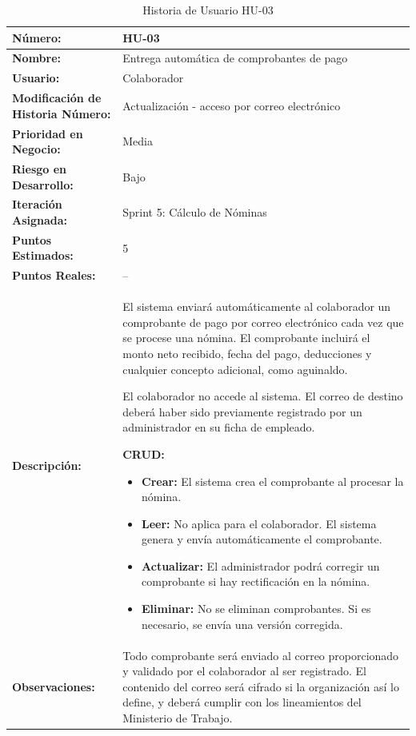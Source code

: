 \begin{table}[h]
	\centering
	\caption{Historia de Usuario HU-03}
	\begin{tabular}{|p{5cm}|p{9cm}|}
		\hline
		\textbf{Número:}                          & HU-03                                         \\ \hline
		\textbf{Nombre:}                          & Entrega automática de comprobantes de pago    \\ \hline
		\textbf{Usuario:}                         & Colaborador                                   \\ \hline
		\textbf{Modificación de Historia Número:} & Actualización - acceso por correo electrónico \\ \hline
		\textbf{Prioridad en Negocio:}            & Media                                         \\ \hline
		\textbf{Riesgo en Desarrollo:}            & Bajo                                          \\ \hline
		\textbf{Iteración Asignada:}              & Sprint 5: Cálculo de Nóminas                  \\ \hline
		\textbf{Puntos Estimados:}                & 5                                             \\ \hline
		\textbf{Puntos Reales:}                   & --                                            \\ \hline
		\textbf{Descripción:}                     &
		El sistema enviará automáticamente al colaborador un comprobante de pago por correo electrónico cada vez que se procese una nómina. El comprobante incluirá el monto neto recibido, fecha del pago, deducciones y cualquier concepto adicional, como aguinaldo.

		El colaborador no accede al sistema. El correo de destino deberá haber sido previamente registrado por un administrador en su ficha de empleado.

		\textbf{CRUD:}
		\begin{itemize}
			\item \textbf{Crear:} El sistema crea el comprobante al procesar la nómina.
			\item \textbf{Leer:} No aplica para el colaborador. El sistema genera y envía automáticamente el comprobante.
			\item \textbf{Actualizar:} El administrador podrá corregir un comprobante si hay rectificación en la nómina.
			\item \textbf{Eliminar:} No se eliminan comprobantes. Si es necesario, se envía una versión corregida.
		\end{itemize}
		\\ \hline
		\textbf{Observaciones:}                   &
		Todo comprobante será enviado al correo proporcionado y validado por el colaborador al ser registrado. El contenido del correo será cifrado si la organización así lo define, y deberá cumplir con los lineamientos del Ministerio de Trabajo.
		\\ \hline
	\end{tabular}
\end{table}





